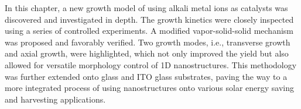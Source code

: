 In this chapter, a new growth model of  using alkali metal ions as catalysts was discovered and investigated in depth. The growth kinetics were closely inspected using a series of controlled experiments. A modified vapor-solid-solid mechanism was proposed and favorably verified. Two growth modes, i.e., transverse growth and axial growth, were highlighted, which not only improved the yield but also allowed for versatile morphology control of 1D  nanostructures. This methodology was further extended onto glass and ITO glass substrates, paving the way to a more integrated process of using  nanostructures onto various solar energy saving and harvesting applications. 
